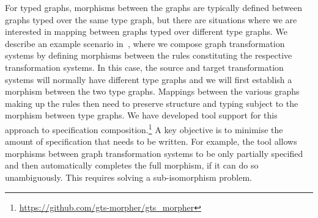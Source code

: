 \documentclass[runningheads]{llncs}
\begin{document}
  For typed graphs, morphisms between the graphs are typically defined between graphs typed over the same type graph, but there are situations where we are interested in mapping between graphs typed over different type graphs.
  We describe an example scenario in~\cite{Duran+12,Duran+17}, where we compose graph transformation systems by defining morphisms between the rules constituting the respective transformation systems.
  In this case, the source and target transformation systems will normally have different type graphs and we will first establish a morphism between the two type graphs.
  Mappings between the various graphs making up the rules then need to preserve structure and typing subject to the morphism between type graphs.
  We have developed tool support for this approach to specification composition.\footnote{\url{https://github.com/gts-morpher/gts_morpher}}
  A key objective is to minimise the amount of specification that needs to be written.
  For example, the tool allows morphisms between graph transformation systems to be only partially specified and then automatically completes the full morphism, if it can do so unambiguously.
  This requires solving a sub-isomorphism problem.
\end{document}
